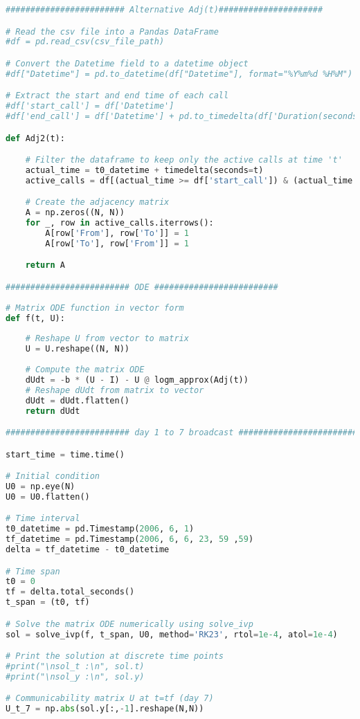 \begin{lstlisting}[language=Python, caption=Voice call experiment]
######################## Alternative Adj(t)#####################

# Read the csv file into a Pandas DataFrame
#df = pd.read_csv(csv_file_path)

# Convert the Datetime field to a datetime object
#df["Datetime"] = pd.to_datetime(df["Datetime"], format="%Y%m%d %H%M")

# Extract the start and end time of each call
#df['start_call'] = df['Datetime']
#df['end_call'] = df['Datetime'] + pd.to_timedelta(df['Duration(seconds)'], unit='s')

def Adj2(t): 

    # Filter the dataframe to keep only the active calls at time 't'
    actual_time = t0_datetime + timedelta(seconds=t)
    active_calls = df[(actual_time >= df['start_call']) & (actual_time <= df['end_call'])]

    # Create the adjacency matrix
    A = np.zeros((N, N))
    for _, row in active_calls.iterrows():
        A[row['From'], row['To']] = 1
        A[row['To'], row['From']] = 1

    return A

######################### ODE #########################
    
# Matrix ODE function in vector form
def f(t, U):
    
    # Reshape U from vector to matrix
    U = U.reshape((N, N))
    
    # Compute the matrix ODE
    dUdt = -b * (U - I) - U @ logm_approx(Adj(t))
    # Reshape dUdt from matrix to vector
    dUdt = dUdt.flatten()
    return dUdt

######################### day 1 to 7 broadcast #########################

start_time = time.time()

# Initial condition 
U0 = np.eye(N)
U0 = U0.flatten()

# Time interval 
t0_datetime = pd.Timestamp(2006, 6, 1)
tf_datetime = pd.Timestamp(2006, 6, 6, 23, 59 ,59)
delta = tf_datetime - t0_datetime

# Time span
t0 = 0
tf = delta.total_seconds() 
t_span = (t0, tf) 

# Solve the matrix ODE numerically using solve_ivp
sol = solve_ivp(f, t_span, U0, method='RK23', rtol=1e-4, atol=1e-4)

# Print the solution at discrete time points
#print("\nsol_t :\n", sol.t)
#print("\nsol_y :\n", sol.y)

# Communicability matrix U at t=tf (day 7)
U_t_7 = np.abs(sol.y[:,-1].reshape(N,N))


\end{lstlisting}
